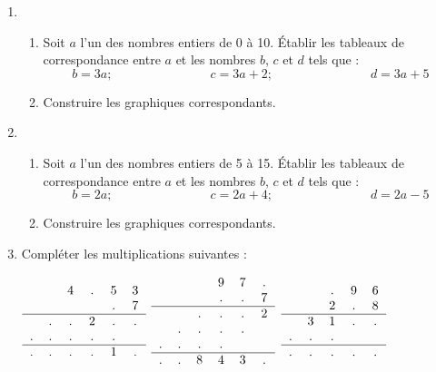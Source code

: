 \begin{enumerate}
\item \begin{enumerate}
\item Soit $a$ l'un des nombres entiers de 0 à 10. 
Établir les tableaux de correspondance entre $a$ et 
les nombres $b$, $c$ et $d$ tels que : 
\[ b= 3 a ; \phantom{meowmeowmeow} c = 3a + 2 ;
\phantom{meowmeowmeow} d = 3a + 5\]
\item Construire les graphiques correspondants. 
\end{enumerate}
\item \begin{enumerate}
\item Soit $a$ l'un des nombres entiers de 5 à 15. 
Établir les tableaux de correspondance entre $a$ et 
les nombres $b$, $c$ et $d$ tels que : 
\[ b= 2 a ; \phantom{meowmeowmeow} c = 2a + 4 ;
\phantom{meowmeowmeow} d = 2a - 5\]
\item Construire les graphiques correspondants. 
\end{enumerate}
\item Compléter les multiplications suivantes : 

  $ \begin{tabular}{cccccc}
   & & 4 & . & 5 & 3 \\
   & &   &   & . & 7  \\
   \hline 
   & . & . & 2 & . & . \\
   . & . &. &. & . &\\
   \hline 
   . &. &. &. & 1 &. 
  \end{tabular}
 $\phantom{meowmeow}
   $ \begin{tabular}{cccccc}
   & & & 9 & 7 & .\\
   & & & . & . &  7 \\
   \hline
   & & . & . &. & 2 \\
   & . & . & . & . & \\
   . & . & . & . & & \\
   \hline 
   . & . & 8 & 4 & 3 & . 
  \end{tabular}
 $
   $ \begin{tabular}{ccccc}
   & & . & 9 & 6 \\ 
   & & 2 & . & 8 \\
   \hline 
   & 3 & 1 & . & . \\
   . & . & . & & \\ 
   \hline 
   . & . & . & . &.
  \end{tabular}
 $

 \end{enumerate}
 